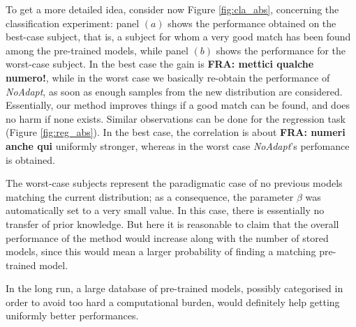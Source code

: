 To get a more detailed idea, consider now Figure \ref{fig:cla_abs},
concerning the classification experiment: panel $(a)$ shows the
performance obtained on the best-case subject, that is, a subject for
whom a very good match has been found among the pre-trained models,
while panel $(b)$ shows the performance for the worst-case subject. In
the best case the gain is \textbf{FRA: mettici qualche numero!}, while
in the worst case we basically re-obtain the performance of
\emph{NoAdapt}, as soon as enough samples from the new distribution
are considered. Essentially, our method improves things if a good
match can be found, and does no harm if none exists. Similar observations can be done for the regression task (Figure
\ref{fig:reg_abs}). In the best case, the correlation is about
\textbf{FRA: numeri anche qui} uniformly stronger, whereas in the
worst case \emph{NoAdapt}'s perfomance is obtained.

The worst-case subjects represent the paradigmatic case of no previous
models matching the current distribution; as a consequence, the
parameter $\beta$ was automatically set to a very small value. In this
case, there is essentially no transfer of prior knowledge. But here it
is reasonable to claim that the overall performance of the method
would increase along with the number of stored models, since this
would mean a larger probability of finding a matching pre-trained
model.

In the long run, a large database of pre-trained models, possibly
categorised in order to avoid too hard a computational burden, would
definitely help getting uniformly better performances.
